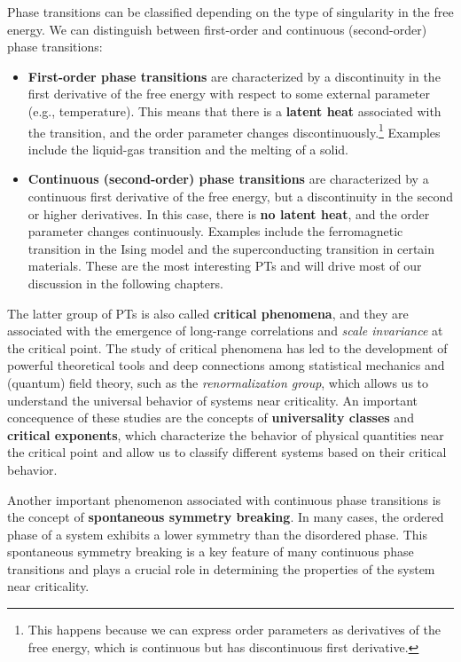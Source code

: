 Phase transitions can be classified depending on the type of singularity in the free energy. We can distinguish between first-order and continuous (second-order) phase transitions:
\begin{itemize}
    \item \textbf{First-order phase transitions} are characterized by a discontinuity in the first derivative of the free energy with respect to some external parameter (e.g., temperature). This means that there is a \textbf{latent heat} associated with the transition, and the order parameter changes discontinuously.\footnote{This happens because we can express order parameters as derivatives of the free energy, which is continuous but has discontinuous first derivative.} Examples include the liquid-gas transition and the melting of a solid.
    \item \textbf{Continuous (second-order) phase transitions} are characterized by a continuous first derivative of the free energy, but a discontinuity in the second or higher derivatives. In this case, there is \textbf{no latent heat}, and the order parameter changes continuously. Examples include the ferromagnetic transition in the Ising model and the superconducting transition in certain materials. These are the most interesting PTs and will drive most of our discussion in the following chapters.
\end{itemize}
The latter group of PTs is also called \textbf{critical phenomena}, and they are associated with the emergence of long-range correlations and \textit{scale invariance} at the critical point. The study of critical phenomena has led to the development of powerful theoretical tools and deep connections among statistical mechanics and (quantum) field theory, such as the \textit{renormalization group}, which allows us to understand the universal behavior of systems near criticality. An important concequence of these studies are the concepts of \textbf{universality classes} and \textbf{critical exponents}, which characterize the behavior of physical quantities near the critical point and allow us to classify different systems based on their critical behavior.

Another important phenomenon associated with continuous phase transitions is the concept of \textbf{spontaneous symmetry breaking}. In many cases, the ordered phase of a system exhibits a lower symmetry than the disordered phase. This spontaneous symmetry breaking is a key feature of many continuous phase transitions and plays a crucial role in determining the properties of the system near criticality.

